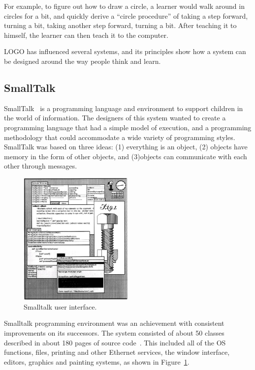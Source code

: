 For example, to figure out how to draw a circle, a learner would walk around in circles for a bit, and quickly derive a ``circle procedure'' of taking a step forward, turning a bit, taking another step forward, turning a bit. After teaching it to himself, the learner can then teach it to the computer. 

LOGO has influenced several systems, and its principles show how a system can be designed around the way people think and learn.
\subsection{SmallTalk}
\label{subsec:smalltalk}
SmallTalk~\citep{Kay1993} is a programming language and environment to support children in the world of information. The designers of this system wanted to create a programming language that had a simple model of execution, and a programming methodology that could accommodate a wide variety of programming styles. SmallTalk was based on three ideas: (1) everything is an object, (2) objects have memory in the form of other objects,  and (3)objects can communicate with each other through messages.

\begin{figure}
  \centering
  \includegraphics[width=0.5\textwidth]{images/smalltalk}
    \caption{Smalltalk user interface.}
    \vspace{-20pt}  
  \label{fig:smalltalk}
\end{figure} 

Smalltalk programming environment was an achievement with consistent improvements on its successors. The system consisted of about 50 classes described in about 180 pages of source code~\citep{Kay1993}. This included all of the OS functions, files, printing and other Ethernet services, the window interface, editors, graphics and painting systems, as shown in Figure~\ref{fig:smalltalk}. 


